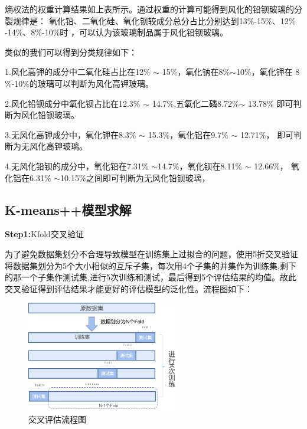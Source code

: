 \documentclass[UTF8]{ctexart}
\begin{document}
                熵权法的权重计算结果如上表所示。通过权重的计算可能得到风化的铅钡玻璃的分裂规律是：
                氧化铅、二氧化硅、氧化钡较成分总分占比分别达到13$\%$-15$\%$、12$\%$-14$\%$、8$\%$-10$\%$时
                ，可以认为该玻璃制品属于风化铅钡玻璃。

                类似的我们可以得到分类规律如下：

                1.风化高钾的成分中二氧化硅占比在12$\%$ $\sim$ 15$\%$，氧化钠在8$\%$$\sim$10$\%$，氧化钾在
            8$\%$-10$\%$的玻璃可以判断为风化高钾玻璃。

            2.风化铅钡成分中氧化钡占比在12.3$\%$ $\sim$ 14.7$\%$,五氧化二磷8.72$\%$$\sim$ 13.78$\%$
        即可判断为风化铅钡玻璃。

        3.无风化高钾成分中，氧化钾在8.3$\%$ $\sim$ 15.3$\%$，氧化铝在9.7$\%$ $\sim$ 12.71$\%$，
        即可判断为无风化高钾玻璃。

        4.无风化铅钡的成分中，氧化铅在7.31$\%$ $\sim$14.7$\%$，氧化钡在8.11$\%$ $\sim$ 12.66$\%$，
        氧化铝在6.31$\%$ $\sim$10.15$\%$之间即可判断为无风化铅钡玻璃，



        \subsection{K-means++模型求解}
        \textbf{Step1:}Kfold交叉验证

        为了避免数据集划分不合理导致模型在训练集上过拟合的问题，使用5折交叉验证将数据集划分为5个大小相似的互斥子集，每次用4个子集的并集作为训练集,剩下的那一个子集作测试集,进行5次训练和测试，最后得到5个评估结果的均值。故此交叉验证得到评估结果才能更好的评估模型的泛化性。流程图如下：

        \begin{figure}[H]\centering
            \includegraphics[width=0.6\textwidth,height=0.45\textwidth]{img/交叉评估流程图.png} %
            \caption{交叉评估流程图} %
            \label{fig:figure 6} %
        \end{figure}
\end{document}
